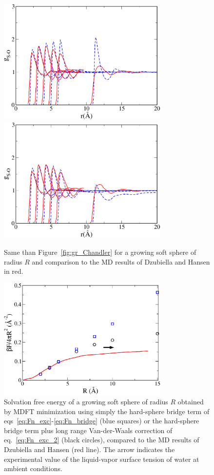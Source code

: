 \documentclass[aip,jcp,preprint]{revtex4-1}
\begin{document}
\begin{figure}
    \includegraphics[width=8.5cm]{gHANSEN_HSB_SPC.pdf}\\
    \includegraphics[width=8.5cm]{gHANSEN_VdW_a12p3_m0p9_SPC.pdf}
    \caption{
        \label{fig:gr_Hansen}
        Same than Figure~\ref{fig:gr_Chandler} for a growing soft sphere of radius $R$ and comparison to the MD results of Dzubiella and Hansen\cite{dzubiella04} in red.         }
\end{figure}

\begin{figure}
    \includegraphics[width=8.5cm]{ener_systemChandler_VdW_MD_SPC.pdf}
    \caption{
        \label{fig:free_energy_Hansen}
        Solvation free energy of a  growing soft sphere of radius $R$ obtained by MDFT minimization using simply the hard-sphere bridge term of eqs~\ref{eq:Fn_exc}-\ref{eq:Fn_bridge} (blue squares) or the hard-sphere bridge term plus long range Van-der-Waals correction of eq.~\ref{eq:Fn_exc_2} (black circles), compared to the MD results of Dzubiella and Hansen\cite{dzubiella04} (red line). The arrow
        indicates the experimental value of the liquid-vapor surface tension of water at ambient conditions.\cite{Lemmon}        }
\end{figure}
\end{document}
